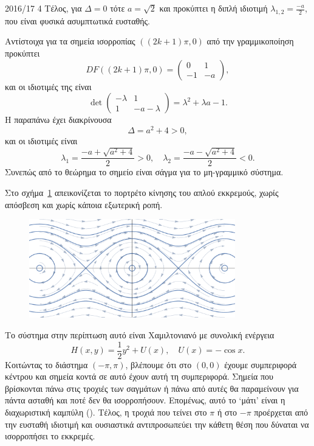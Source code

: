 \begin{solution}{2016/17 4}
    Τέλος, για \( \Delta = 0 \) τότε \( a = \sqrt{2} \) και προκύπτει η διπλή
    ιδιοτιμή \( \lambda_{1,2} = \frac{-a}{2} \), που είναι φυσικά ασυμπτωτικά
    ευσταθής.

    Αντίστοιχα για τα σημεία ισορροπίας \( ((2k + 1)\pi, 0) \) από την γραμμικοποίηση προκύπτει
    \[
        DF((2k + 1)\pi, 0) = \begin{pmatrix}
            0 & 1 \\
            -1 & -a
        \end{pmatrix},
    \]
    και οι ιδιοτιμές της είναι
    \[
        \det
        \begin{pmatrix}
            -\lambda & 1 \\
            1 & -a - \lambda
        \end{pmatrix}
        = \lambda^2 + \lambda a - 1.
    \]
    Η παραπάνω έχει διακρίνουσα
    \[
        \Delta = a^2 + 4 > 0,
    \]
    και οι ιδιοτιμές είναι
    \[
        \lambda_1 = \frac{-a + \sqrt{a^2 + 4}}{2} > 0, \quad
        \lambda_2 = \frac{-a - \sqrt{a^2 + 4}}{2} < 0.
    \]
    Συνεπώς από το θεώρημα  το σημείο είναι
    σάγμα για το μη-γραμμικό σύστημα.

    Στο σχήμα~\ref{fig:ex4_undampedPendComb} απεικονίζεται το πορτρέτο κίνησης
    του απλού εκκρεμούς, χωρίς απόσβεση και χωρίς κάποια εξωτερική ροπή.
    \begin{figure}[h]
        \centering
        \includegraphics[width=0.8\textwidth]{figures/ex4_undampedPendComb.pdf}
        \caption{}
        \label{fig:ex4_undampedPendComb}
    \end{figure}
    Το σύστημα στην περίπτωση αυτό είναι Χαμιλτονιανό με συνολική ενέργεια
    \[
        H(x, y) = \frac{1}{2}y^2 + U(x),\quad U(x) = - \cos{x}.
    \]
    Κοιτώντας το διάστημα \( (-\pi, \pi) \), βλέπουμε ότι στο \( (0, 0) \) έχουμε
    συμπεριφορά κέντρου και σημεία κοντά σε αυτό έχουν αυτή τη συμπεριφορά. Σημεία
    που βρίσκονται πάνω στις τροχιές των σαγμάτων ή πάνω από αυτές θα παραμείνουν
    για πάντα ασταθή και ποτέ δεν θα ισορροπήσουν. Επομένως, αυτό το
    \enquote*{μάτι} είναι η διαχωριστική καμπύλη (). Τέλος, η
    τροχιά που τείνει στο \( \pi \) ή στο \( -\pi \) προέρχεται από την ευσταθή
    ιδιοτιμή και ουσιαστικά αντιπροσωπεύει την κάθετη θέση που δύναται να
    ισορροπήσει το εκκρεμές.


\end{solution}
